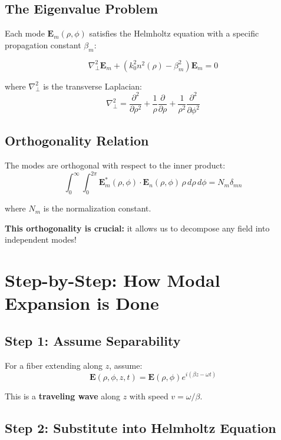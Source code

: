 \documentclass[12pt]{article}
\begin{document}
\subsection{The Eigenvalue Problem}

Each mode $\mathbf{E}_m(\rho, \phi)$ satisfies the Helmholtz equation with a specific propagation constant $\beta_m$:

\begin{equation}
\nabla_\perp^2 \mathbf{E}_m + (k_0^2 n^2(\rho) - \beta_m^2) \mathbf{E}_m = 0
\end{equation}

where $\nabla_\perp^2$ is the transverse Laplacian:
$$\nabla_\perp^2 = \frac{\partial^2}{\partial \rho^2} + \frac{1}{\rho}\frac{\partial}{\partial \rho} + \frac{1}{\rho^2}\frac{\partial^2}{\partial \phi^2}$$

\subsection{Orthogonality Relation}

The modes are orthogonal with respect to the inner product:
\begin{equation}
\int_0^\infty \int_0^{2\pi} \mathbf{E}_m^*(\rho, \phi) \cdot \mathbf{E}_n(\rho, \phi) \, \rho \, d\rho \, d\phi = N_m \delta_{mn}
\end{equation}

where $N_m$ is the normalization constant.

\textbf{This orthogonality is crucial:} it allows us to decompose any field into independent modes!

\section{Step-by-Step: How Modal Expansion is Done}

\subsection{Step 1: Assume Separability}

For a fiber extending along $z$, assume:
\begin{equation}
\mathbf{E}(\rho, \phi, z, t) = \mathbf{E}(\rho, \phi) e^{i(\beta z - \omega t)}
\end{equation}

This is a \textbf{traveling wave} along $z$ with speed $v = \omega/\beta$.

\subsection{Step 2: Substitute into Helmholtz Equation}
\end{document}

